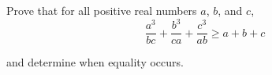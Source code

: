 Prove that for all positive real numbers $a$,  $b$,  and $c$, \[ \frac{a^3}{bc} + \frac{b^3}{ca} + \frac{c^3}{ab} \geq a+b+c \]

and determine when equality occurs.